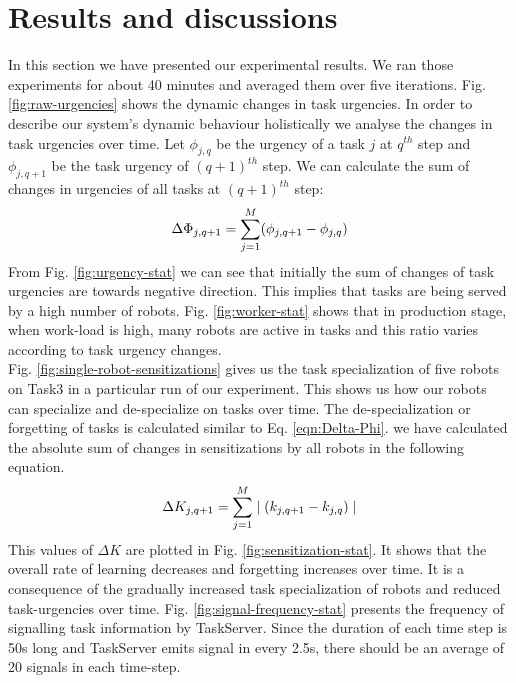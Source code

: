 \section{Results and discussions}
\label{afm:results}
In this section we have presented our experimental results. We ran those experiments for about 40 minutes and averaged them over five iterations.
Fig. \ref{fig:raw-urgencies} shows the dynamic changes in task urgencies.  In order to describe our system's dynamic behaviour holistically we analyse the changes in task urgencies over time. Let $ \phi_{j, q}$ be the urgency of a task $j$ at $q^{th}$ step and $\phi_{j, q+1}$ be the task urgency of $(q+1)^{th}$ step. We can calculate the sum of changes in urgencies of all tasks at $(q+1)^{th}$ step:
\begin{equation} 
\small
\Delta \Phi_{j, q+1} = \sum_{j=1}^{M} (\phi_{j, q+1} - \phi_{j, q})
\label{eqn:Delta-Phi}
\end{equation}
From Fig. \ref{fig:urgency-stat} we can see that initially the sum of changes of task urgencies are towards negative direction. This implies that tasks are being served by a high number of robots. Fig. \ref{fig:worker-stat} shows that in production stage, when  work-load is high, many robots are active in tasks and this ratio varies according to task urgency changes.\\ 
Fig. \ref{fig:single-robot-sensitizations} gives us the task specialization of five robots on Task3 in a particular run of our experiment. This shows us how our robots can specialize and de-specialize on tasks over time. The de-specialization or forgetting of tasks is calculated similar to Eq. \ref{eqn:Delta-Phi}. we have calculated the absolute sum of changes in sensitizations by all robots in the following equation.
% 
\begin{equation}
\small 
\Delta K_{j, q+1} = \sum_{j=1}^{M} \mid (k_{j, q+1} - k_{j, q}) \mid
\label{eqn:Delta-K}
\end{equation}
This values of $\Delta K$ are plotted in Fig. \ref{fig:sensitization-stat}. It shows that the overall rate of learning decreases and forgetting increases over time. It is a consequence of the gradually increased task specialization of robots and reduced task-urgencies over time.
Fig. \ref{fig:signal-frequency-stat} presents the frequency of signalling task information by TaskServer. Since the duration of each time step is 50s long and TaskServer emits signal in every 2.5s, there should be an average of 20 signals in each time-step.\\
